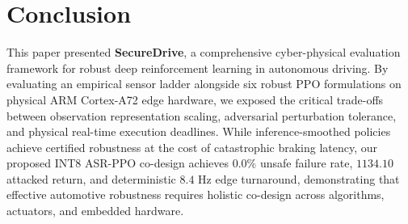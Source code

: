 \documentclass[conference]{IEEEtran}
\begin{document}
\section{Conclusion}
This paper presented \textbf{SecureDrive}, a comprehensive cyber-physical evaluation framework for robust deep reinforcement learning in autonomous driving. By evaluating an empirical sensor ladder alongside six robust PPO formulations on physical ARM Cortex-A72 edge hardware, we exposed the critical trade-offs between observation representation scaling, adversarial perturbation tolerance, and physical real-time execution deadlines. While inference-smoothed policies achieve certified robustness at the cost of catastrophic braking latency, our proposed INT8 ASR-PPO co-design achieves $0.0\%$ unsafe failure rate, $1134.10$ attacked return, and deterministic $8.4\text{ Hz}$ edge turnaround, demonstrating that effective automotive robustness requires holistic co-design across algorithms, actuators, and embedded hardware.
\end{document}
